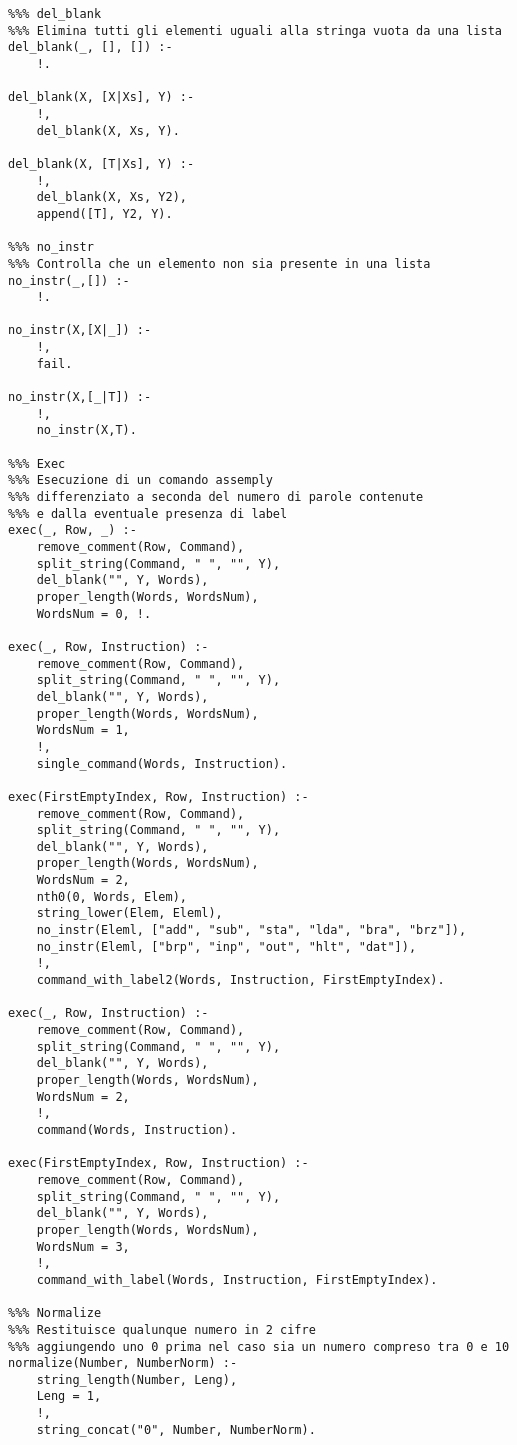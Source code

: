 \documentclass[a4paper,12pt, oneside]{book}
\begin{document}
\begin{verbatim}
%%% del_blank
%%% Elimina tutti gli elementi uguali alla stringa vuota da una lista
del_blank(_, [], []) :- 
    !.

del_blank(X, [X|Xs], Y) :- 
    !, 
    del_blank(X, Xs, Y).

del_blank(X, [T|Xs], Y) :- 
    !, 
    del_blank(X, Xs, Y2), 
    append([T], Y2, Y).

%%% no_instr
%%% Controlla che un elemento non sia presente in una lista
no_instr(_,[]) :- 
    !.

no_instr(X,[X|_]) :-
    !,
    fail.

no_instr(X,[_|T]) :- 
    !,
    no_instr(X,T).

%%% Exec
%%% Esecuzione di un comando assemply
%%% differenziato a seconda del numero di parole contenute
%%% e dalla eventuale presenza di label 
exec(_, Row, _) :- 
    remove_comment(Row, Command),
    split_string(Command, " ", "", Y),
    del_blank("", Y, Words),
    proper_length(Words, WordsNum),
    WordsNum = 0, !.

exec(_, Row, Instruction) :- 
    remove_comment(Row, Command),
    split_string(Command, " ", "", Y), 
    del_blank("", Y, Words), 
    proper_length(Words, WordsNum), 
    WordsNum = 1,
    !,
    single_command(Words, Instruction).

exec(FirstEmptyIndex, Row, Instruction) :- 
    remove_comment(Row, Command),
    split_string(Command, " ", "", Y), 
    del_blank("", Y, Words), 
    proper_length(Words, WordsNum),
    WordsNum = 2,
    nth0(0, Words, Elem),
    string_lower(Elem, Eleml),
    no_instr(Eleml, ["add", "sub", "sta", "lda", "bra", "brz"]), 
    no_instr(Eleml, ["brp", "inp", "out", "hlt", "dat"]),
    !,
    command_with_label2(Words, Instruction, FirstEmptyIndex).

exec(_, Row, Instruction) :- 
    remove_comment(Row, Command),
    split_string(Command, " ", "", Y), 
    del_blank("", Y, Words), 
    proper_length(Words, WordsNum),
    WordsNum = 2,
    !,
    command(Words, Instruction).

exec(FirstEmptyIndex, Row, Instruction) :- 
    remove_comment(Row, Command),
    split_string(Command, " ", "", Y), 
    del_blank("", Y, Words), 
    proper_length(Words, WordsNum), 
    WordsNum = 3,
    !,
    command_with_label(Words, Instruction, FirstEmptyIndex).

%%% Normalize
%%% Restituisce qualunque numero in 2 cifre
%%% aggiungendo uno 0 prima nel caso sia un numero compreso tra 0 e 10
normalize(Number, NumberNorm) :- 
    string_length(Number, Leng),
    Leng = 1,
    !,
    string_concat("0", Number, NumberNorm).
                                 

\end{verbatim}
\end{document}
